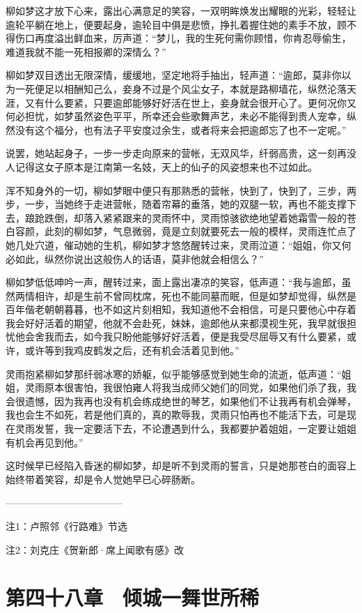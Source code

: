 柳如梦这才放下心来，露出心满意足的笑容，一双明眸焕发出耀眼的光彩，轻轻让逾轮平躺在地上，便要起身，逾轮目中俱是悲愤，挣扎着握住她的素手不放，顾不得伤口再度溢出鲜血来，厉声道：“梦儿，我的生死何需你顾惜，你肯忍辱偷生，难道我就不能一死相报卿的深情么？”

柳如梦双目透出无限深情，缓缓地，坚定地将手抽出，轻声道：“逾郎，莫非你以为一死便足以相酬知己么，妾身不过是个风尘女子，本就是路柳墙花，纵然沦落天涯，又有什么要紧，只要逾郎能够好好活在世上，妾身就会很开心了。更何况你又何必担忧，如梦虽然姿色平平，所幸还会些歌舞声艺，未必不能得到贵人宠幸，纵然没有这个福分，也有法子平安度过余生，或者将来会把逾郎忘了也不一定呢。”

说罢，她站起身子，一步一步走向原来的营帐，无双风华，纤弱高贵，这一刻再没人记得这女子原本是江南第一名妓，天上的仙子的风姿想来也不过如此。

浑不知身外的一切，柳如梦眼中便只有那熟悉的营帐，快到了，快到了，三步，两步，一步，当她终于走进营帐，随着帘幕的垂落，她的双腿一软，再也不能支撑下去，踉跄跌倒，却落入紧紧跟来的灵雨怀中，灵雨惊骇欲绝地望着她霜雪一般的苍白容颜，此刻的柳如梦，气息微弱，竟是立刻就要死去一般的模样，灵雨连忙点了她几处穴道，催动她的生机，柳如梦才悠悠醒转过来，灵雨泣道：“姐姐，你又何必如此，纵然你说出这般伤人的话语，莫非他就会相信么？”

柳如梦低低呻吟一声，醒转过来，面上露出凄凉的笑容，低声道：“我与逾郎，虽然两情相许，却是生前不曾同枕席，死也不能同墓而眠，但是如梦却觉得，纵然是百年偕老朝朝暮暮，也不如这片刻相知，我知道他不会相信，可是只要他心中存着我会好好活着的期望，他就不会赴死，妹妹，逾郎他从来都漠视生死，我早就很担忧他会舍我而去，如今我只盼他能够好好活着，便是我受尽屈辱又有什么要紧，或许，或许等到我鸡皮鹤发之后，还有机会活着见到他。”

灵雨抱紧柳如梦那纤弱冰寒的娇躯，似乎能够感觉到她生命的流逝，低声道：“姐姐，灵雨原本很害怕，我很怕雍人将我当成师父她们的同党，如果他们杀了我，我会很遗憾，因为我再也没有机会练成绝世的琴艺，如果他们不让我再有机会弹琴，我也会生不如死，若是他们真的，真的欺辱我，灵雨只怕再也不能活下去，可是现在灵雨发誓，我一定要活下去，不论遭遇到什么，我都要护着姐姐，一定要让姐姐有机会再见到他。”

这时候早已经陷入昏迷的柳如梦，却是听不到灵雨的誓言，只是她那苍白的面容上始终带着笑容，却是令人觉她早已心碎肠断。

————————————

注1：卢照邻《行路难》节选

注2：刘克庄《贺新郎·席上闻歌有感》改

\chapter{第四十八章　倾城一舞世所稀}

